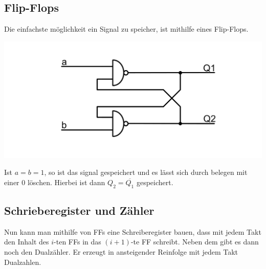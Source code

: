 \documentclass[10pt]{article}
\newenvironment{Figure}
  {\par\medskip\noindent\minipage{\linewidth}}
  {\endminipage\par\medskip}
\begin{document}
\begin{multicols}{2}
	\subsection{Flip-Flops}
	Die einfachste möglichkeit ein Signal zu speicher, ist mithilfe eines Flip-Flops.
	\begin{Figure}
		\centering
		\includegraphics[width=1\textwidth]{fliflop.png}
	\end{Figure}
	Ist $a=b=1$, so ist das signal gespeichert und es lässt sich durch belegen mit einer 0 löschen. Hierbei ist dann $Q_2=\overline{Q_1}$ gespeichert.
	\subsection{Schrieberegister und Zähler}
	Nun kann man mithilfe von FFs eine Schreiberegister bauen, dass mit jedem Takt den Inhalt des $i$-ten FFs in das $(i+1)$-te FF schreibt. Neben dem gibt es dann noch den Dualzähler. Er erzeugt in ansteigender Reinfolge mit jedem Takt Dualzahlen.

\end{multicols}
\end{document}
